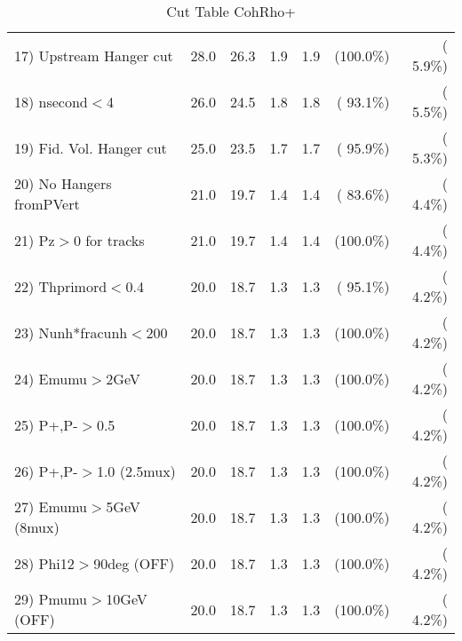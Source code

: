 \begin{table}[h!]
\begin{tabular}{||l||r|r|r|r|r|r||}
 17) Upstream Hanger cut  &         28.0 &         26.3 &          1.9 &          1.9 & (100.0\%) & (  5.9\%) \\
 18) nsecond$<$4          &         26.0 &         24.5 &          1.8 &          1.8 & ( 93.1\%) & (  5.5\%) \\
 19) Fid. Vol. Hanger cut &         25.0 &         23.5 &          1.7 &          1.7 & ( 95.9\%) & (  5.3\%) \\
 20) No Hangers fromPVert &         21.0 &         19.7 &          1.4 &          1.4 & ( 83.6\%) & (  4.4\%) \\
 21) Pz$>$0 for tracks    &         21.0 &         19.7 &          1.4 &          1.4 & (100.0\%) & (  4.4\%) \\
 22) Thprimord$<$0.4      &         20.0 &         18.7 &          1.3 &          1.3 & ( 95.1\%) & (  4.2\%) \\
 23) Nunh*fracunh$<$200   &         20.0 &         18.7 &          1.3 &          1.3 & (100.0\%) & (  4.2\%) \\
 24) Emumu$>$2GeV         &         20.0 &         18.7 &          1.3 &          1.3 & (100.0\%) & (  4.2\%) \\
 25) P+,P-$>$0.5          &         20.0 &         18.7 &          1.3 &          1.3 & (100.0\%) & (  4.2\%) \\
 26) P+,P-$>$1.0 (2.5mux) &         20.0 &         18.7 &          1.3 &          1.3 & (100.0\%) & (  4.2\%) \\
 27) Emumu$>$5GeV  (8mux) &         20.0 &         18.7 &          1.3 &          1.3 & (100.0\%) & (  4.2\%) \\
 28) Phi12$>$90deg  (OFF) &         20.0 &         18.7 &          1.3 &          1.3 & (100.0\%) & (  4.2\%) \\
 29) Pmumu$>$10GeV  (OFF) &         20.0 &         18.7 &          1.3 &          1.3 & (100.0\%) & (  4.2\%) \\
 \hline
 \hline
 \end{tabular}
 \caption{Cut Table  CohRho+  }
 \label{tab-cutcohjpsi-mumu_anumunc}
 \end{table}
